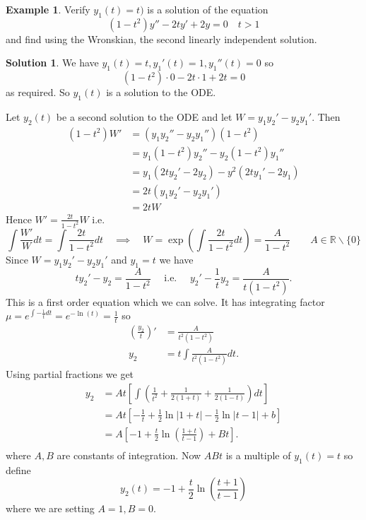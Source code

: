 \documentclass{article}
\theoremstyle{plain}
\theoremstyle{definition}
\newtheorem{exmp}{Example}[section]
\newtheorem*{sol}{Solution}
\numberwithin{equation}{section}
\begin{document}
\begin{tcolorbox}
    \begin{exmp}\label{exmp:RedofOrder2}
        Verify $y_1(t) = t)$ is a solution of the equation
        \[
            (1-t^2)y'' - 2ty' + 2y = 0 \quad t>1
        \]
        and find using the Wronskian, the second linearly independent solution.
    \end{exmp}
    \begin{sol}
        We have $y_1(t) = t, y_1'(t) = 1, y_1''(t) = 0$ so
        \[
            (1-t^2)\cdot 0 -2t \cdot 1 + 2t = 0
        \]
        as required. So $y_1(t)$ is a solution to the ODE.

        Let $y_2(t)$ be a second solution to the ODE and let $W = y_1y_2' - y_2y_1'$. Then
        \begin{align*}
            (1-t^2)W' &= (y_1y_2'' - y_2y_1'')(1-t^2) \\
            &= y_1(1-t^2)y_2'' - y_2(1-t^2)y_1'' \\
            &= y_1(2ty_2' - 2y_2) - y^2(2ty_1' - 2y_1) \\
            &= 2t(y_1y_2' - y_2y_1') \\
            &= 2tW
        \end{align*}
        Hence $W' = \frac{2t}{1-t^2}W$ i.e.
        \[
        \int \frac{W'}{W} dt = \int \frac{2t}{1-t^2} dt \quad
        \implies \quad W = \exp\left(\int \frac{2t}{1-t^2} dt \right) 
        = \frac{A}{1-t^2} \qquad A \in \mathbb{R}\backslash\{0\}        
        \]
        Since $W = y_1y_2' - y_2y_1'$ and $y_1=t$ we have
        \[
        ty_2'-y_2 = \frac{A}{1-t^2} \quad \text{ i.e. } \quad y_2'-\frac{1}{t}y_2 = \frac{A}{t(1-t^2)}.
        \]
        This is a first order equation which we can solve. It has integrating factor $\mu = e^{\int -\frac{1}{t}dt} = e^{-\ln(t)}=\frac{1}{t}$ so
        \begin{align*}
            \left( \frac{y_2}{t} \right)' &= \frac{A}{t^2(1-t^2)} \\
            y_2 &= t \int \frac{A}{t^2(1-t^2)} dt.
        \end{align*}
        Using partial fractions we get
        \begin{align*}
            y_2 &= At \left[ \int \left( \frac{1}{t^2} + \frac{1}{2(1+t)} + \frac{1}{2(1-t)}\right) dt \right] \\
            &= At \left[ -\frac{1}{t} + \frac{1}{2} \ln \left\vert 1+t \right\vert - \frac{1}{2} \ln \left\vert t-1 \right\vert + b\right] \\
            &= A \left[ -1 + \frac{t}{2}\ln\left( \frac{1+t}{t-1} \right) + Bt \right].\\
        \end{align*}
        where $A,B$ are constants of integration. Now $ABt$ is a multiple of $y_1(t) = t$ so define
        \[
            y_2(t) = -1 + \frac{t}{2}\ln \left( \frac{t+1}{t-1} \right)
        \]
        where we are setting $A=1, B=0$.
    \end{sol}
\end{tcolorbox}
\end{document}

